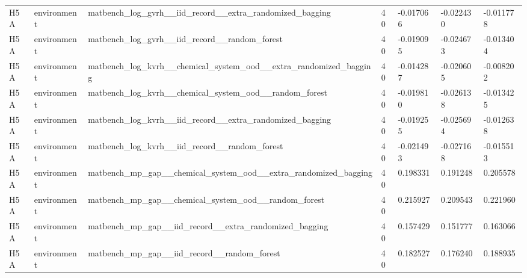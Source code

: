 \documentclass[10pt]{article}
\begin{document}
\begin{landscape}
\begin{longtable}{L{.35in}L{.6in}L{3.55in}L{.4in}L{.88in}L{.88in}L{.88in}}
H5A & environment & matbench\_\allowbreak{}log\_\allowbreak{}gvrh\_\allowbreak{}\_\allowbreak{}iid\_\allowbreak{}record\_\allowbreak{}\_\allowbreak{}extra\_\allowbreak{}randomized\_\allowbreak{}bagging & 40 & -0.017066 & -0.022430 & -0.011778\\
H5A & environment & matbench\_\allowbreak{}log\_\allowbreak{}gvrh\_\allowbreak{}\_\allowbreak{}iid\_\allowbreak{}record\_\allowbreak{}\_\allowbreak{}random\_\allowbreak{}forest & 40 & -0.019095 & -0.024673 & -0.013404\\
H5A & environment & matbench\_\allowbreak{}log\_\allowbreak{}kvrh\_\allowbreak{}\_\allowbreak{}chemical\_\allowbreak{}system\_\allowbreak{}ood\_\allowbreak{}\_\allowbreak{}extra\_\allowbreak{}randomized\_\allowbreak{}bagging & 40 & -0.014287 & -0.020605 & -0.008202\\
H5A & environment & matbench\_\allowbreak{}log\_\allowbreak{}kvrh\_\allowbreak{}\_\allowbreak{}chemical\_\allowbreak{}system\_\allowbreak{}ood\_\allowbreak{}\_\allowbreak{}random\_\allowbreak{}forest & 40 & -0.019810 & -0.026138 & -0.013425\\
H5A & environment & matbench\_\allowbreak{}log\_\allowbreak{}kvrh\_\allowbreak{}\_\allowbreak{}iid\_\allowbreak{}record\_\allowbreak{}\_\allowbreak{}extra\_\allowbreak{}randomized\_\allowbreak{}bagging & 40 & -0.019255 & -0.025694 & -0.012638\\
H5A & environment & matbench\_\allowbreak{}log\_\allowbreak{}kvrh\_\allowbreak{}\_\allowbreak{}iid\_\allowbreak{}record\_\allowbreak{}\_\allowbreak{}random\_\allowbreak{}forest & 40 & -0.021493 & -0.027168 & -0.015513\\
H5A & environment & matbench\_\allowbreak{}mp\_\allowbreak{}gap\_\allowbreak{}\_\allowbreak{}chemical\_\allowbreak{}system\_\allowbreak{}ood\_\allowbreak{}\_\allowbreak{}extra\_\allowbreak{}randomized\_\allowbreak{}bagging & 40 & 0.198331 & 0.191248 & 0.205578\\
H5A & environment & matbench\_\allowbreak{}mp\_\allowbreak{}gap\_\allowbreak{}\_\allowbreak{}chemical\_\allowbreak{}system\_\allowbreak{}ood\_\allowbreak{}\_\allowbreak{}random\_\allowbreak{}forest & 40 & 0.215927 & 0.209543 & 0.221960\\
H5A & environment & matbench\_\allowbreak{}mp\_\allowbreak{}gap\_\allowbreak{}\_\allowbreak{}iid\_\allowbreak{}record\_\allowbreak{}\_\allowbreak{}extra\_\allowbreak{}randomized\_\allowbreak{}bagging & 40 & 0.157429 & 0.151777 & 0.163066\\
H5A & environment & matbench\_\allowbreak{}mp\_\allowbreak{}gap\_\allowbreak{}\_\allowbreak{}iid\_\allowbreak{}record\_\allowbreak{}\_\allowbreak{}random\_\allowbreak{}forest & 40 & 0.182527 & 0.176240 & 0.188935\\

\end{longtable}
\end{landscape}
\end{document}
